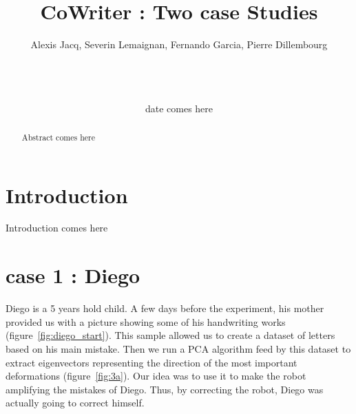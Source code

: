 \documentclass{sig-alternate}
\begin{document}

\title{CoWriter : Two case Studies}

\author{
\alignauthor
Alexis Jacq, Severin Lemaignan, Fernando Garcia, Pierre Dillembourg\\
    \\
    \\
    \\
}

\date{date comes here}


\maketitle
\begin{abstract}
Abstract comes here
\end{abstract}


\section{Introduction}
Introduction comes here


\section{case 1 : Diego}
Diego is a 5 years hold child. 
A few days before the experiment, his mother provided us with a picture showing
some of his handwriting works (figure~\ref{fig:diego_start}). 
This sample allowed us to create a dataset of letters based on his main mistake.
Then we run a PCA algorithm feed by this dataset to extract eigenvectors
representing the direction of the most important
deformations (figure~\ref{fig:3a}). 
Our idea was to use it to make the robot amplifying the mistakes of Diego. 
Thus, by correcting the robot, Diego was actually going to correct himself.    
\end{document}
